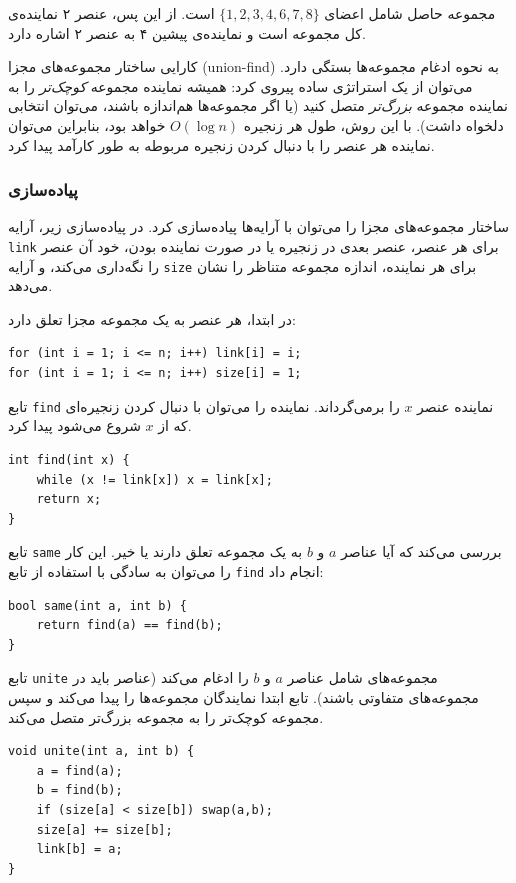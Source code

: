 مجموعه حاصل شامل اعضای
$\{1,2,3,4,6,7,8\}$ است.
از این پس، عنصر ۲ نماینده‌ی کل مجموعه است
و نماینده‌ی پیشین ۴ به عنصر ۲ اشاره دارد.

کارایی ساختار مجموعه‌های مجزا (union-find) به نحوه
ادغام مجموعه‌ها بستگی دارد.
می‌توان از یک استراتژی ساده پیروی کرد:
همیشه نماینده مجموعه \emph{کوچک‌تر} را به نماینده مجموعه \emph{بزرگ‌تر}
متصل کنید (یا اگر مجموعه‌ها هم‌اندازه باشند،
می‌توان انتخابی دلخواه داشت).
با این روش، طول هر زنجیره $O(\log n)$ خواهد بود،
بنابراین می‌توان نماینده هر عنصر را با دنبال کردن
زنجیره مربوطه به طور کارآمد پیدا کرد.

\subsubsection{پیاده‌سازی}

ساختار مجموعه‌های مجزا را می‌توان
با آرایه‌ها پیاده‌سازی کرد.
در پیاده‌سازی زیر،
آرایه \texttt{link} برای هر عنصر،
عنصر بعدی در زنجیره یا در صورت نماینده بودن،
خود آن عنصر را نگه‌داری می‌کند،
و آرایه \texttt{size} برای هر نماینده،
اندازه مجموعه متناظر را نشان می‌دهد.

در ابتدا، هر عنصر به یک مجموعه مجزا تعلق دارد:
\begin{lstlisting}
for (int i = 1; i <= n; i++) link[i] = i;
for (int i = 1; i <= n; i++) size[i] = 1;
\end{lstlisting}

تابع \texttt{find} نماینده
عنصر $x$ را برمی‌گرداند.
نماینده را می‌توان با دنبال کردن
زنجیره‌ای که از $x$ شروع می‌شود پیدا کرد.

\begin{lstlisting}
int find(int x) {
    while (x != link[x]) x = link[x];
    return x;
}
\end{lstlisting}

تابع \texttt{same} بررسی می‌کند
که آیا عناصر $a$ و $b$ به یک مجموعه تعلق دارند یا خیر.
این کار را می‌توان به سادگی با استفاده از
تابع \texttt{find} انجام داد:

\begin{lstlisting}
bool same(int a, int b) {
    return find(a) == find(b);
}
\end{lstlisting}

\begin{samepage}
تابع \texttt{unite} مجموعه‌های شامل
عناصر $a$ و $b$ را ادغام می‌کند
(عناصر باید در مجموعه‌های متفاوتی باشند).
تابع ابتدا نمایندگان مجموعه‌ها را پیدا می‌کند
و سپس مجموعه کوچک‌تر را به مجموعه بزرگ‌تر متصل می‌کند.

\begin{lstlisting}
void unite(int a, int b) {
    a = find(a);
    b = find(b);
    if (size[a] < size[b]) swap(a,b);
    size[a] += size[b];
    link[b] = a;
}
\end{lstlisting}
\end{samepage}

